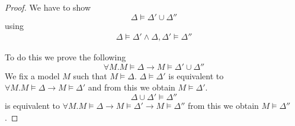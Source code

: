 \begin{mytheorem}
\begin{proof}
We have to show $$ \Delta \models \Delta' \cup \Delta'' $$ using
\begin{align*}
\Delta \models \Delta'  \wedge \Delta,\Delta' \models \Delta''
\end{align*}

%
%
%
%
To do this we prove the following
$$\forall M. M \models \Delta \to M \models \Delta' \cup \Delta''$$
We fix a model $M$ such that $M \models \Delta$. $\Delta \models \Delta'$ is equivalent to $\forall M. M \models \Delta \to M \models \Delta'$ and from this we obtain $M \models \Delta'$. $$\Delta \cup \Delta' \models \Delta''$$ is equivalent to $\forall M. M \models \Delta \to M \models \Delta' \to M \models \Delta''$ from this we obtain $M \models \Delta''$.
\end{proof}
%
\end{mytheorem}
